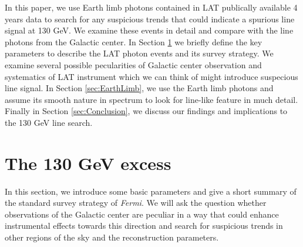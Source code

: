 \documentclass[aps,twocolumn,prd,superscriptaddress,showpacs,nofootinbib,fixfloat]{revtex4}
\newcommand{\Fermi}{{\slshape Fermi}}
\newcommand\Refsec[1]{Section \ref{sec:#1}}
\begin{document}
In this paper, we use Earth limb photons contained in LAT
publically available 4 years data to search for any
suspicious trends that could indicate a spurious line signal
at 130 GeV.  We examine these events in detail and compare
with the line photons from the Galactic center.  In
\Refsec{130GeV} we briefly define the key parameters to
describe the LAT photon events and its survey strategy. We
examine several possible pecularities of Galactic center
observation and systematics of LAT instrument which we can
think of might introduce suspecious line signal. In
\Refsec{EarthLimb}, we use the Earth limb photons and assume
its smooth nature in spectrum to look for line-like feature
in much detail. Finally in \Refsec{Conclusion}, we discuss
our findings and implications to the 130 GeV line search.


\section{The 130 GeV excess}
\label{sec:130GeV}
In this section, %
we introduce some basic parameters and give a short
summary of the standard survey strategy of \Fermi. We will
ask the question whether observations of the Galactic center
are peculiar in a way that could enhance instrumental
effects towards this direction and search for suspicious trends in
other regions of the sky and the reconstruction parameters.

\end{document}
